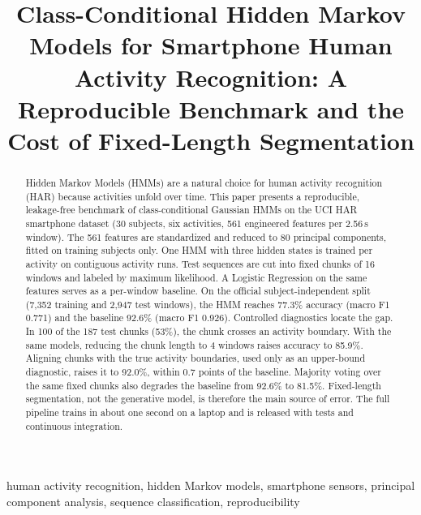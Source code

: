 \documentclass[conference]{IEEEtran}
\begin{document}
\title{Class-Conditional Hidden Markov Models for Smartphone Human Activity Recognition: A Reproducible Benchmark and the Cost of Fixed-Length Segmentation}

\author{
}

\maketitle

\begin{abstract}
Hidden Markov Models (HMMs) are a natural choice for human activity recognition (HAR) because activities unfold over time. This paper presents a reproducible, leakage-free benchmark of class-conditional Gaussian HMMs on the UCI HAR smartphone dataset (30 subjects, six activities, 561 engineered features per 2.56\,s window). The 561 features are standardized and reduced to 80 principal components, fitted on training subjects only. One HMM with three hidden states is trained per activity on contiguous activity runs. Test sequences are cut into fixed chunks of 16 windows and labeled by maximum likelihood. A Logistic Regression on the same features serves as a per-window baseline. On the official subject-independent split (7,352 training and 2,947 test windows), the HMM reaches 77.3\% accuracy (macro F1 0.771) and the baseline 92.6\% (macro F1 0.926). Controlled diagnostics locate the gap. In 100 of the 187 test chunks (53\%), the chunk crosses an activity boundary. With the same models, reducing the chunk length to 4 windows raises accuracy to 85.9\%. Aligning chunks with the true activity boundaries, used only as an upper-bound diagnostic, raises it to 92.0\%, within 0.7 points of the baseline. Majority voting over the same fixed chunks also degrades the baseline from 92.6\% to 81.5\%. Fixed-length segmentation, not the generative model, is therefore the main source of error. The full pipeline trains in about one second on a laptop and is released with tests and continuous integration.
\end{abstract}

\begin{IEEEkeywords}
human activity recognition, hidden Markov models, smartphone sensors, principal component analysis, sequence classification, reproducibility
\end{IEEEkeywords}
\end{document}
